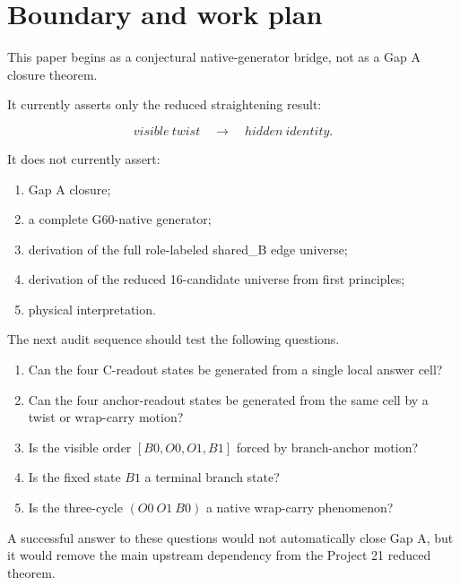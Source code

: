 \section{Boundary and work plan}

This paper begins as a conjectural native-generator bridge, not as a Gap A closure theorem.

It currently asserts only the reduced straightening result:

\[
    visible\ twist \quad\longrightarrow\quad hidden\ identity.
\]

It does not currently assert:
\begin{enumerate}
\item Gap A closure;
\item a complete G60-native generator;
\item derivation of the full role-labeled shared\_B edge universe;
\item derivation of the reduced 16-candidate universe from first principles;
\item physical interpretation.
\end{enumerate}

The next audit sequence should test the following questions.

\begin{enumerate}
\item Can the four C-readout states be generated from a single local answer cell?
\item Can the four anchor-readout states be generated from the same cell by a twist or wrap-carry motion?
\item Is the visible order \([B0,O0,O1,B1]\) forced by branch-anchor motion?
\item Is the fixed state \(B1\) a terminal branch state?
\item Is the three-cycle \((O0\ O1\ B0)\) a native wrap-carry phenomenon?
\end{enumerate}

A successful answer to these questions would not automatically close Gap A, but it would remove the main upstream dependency from the Project 21 reduced theorem.
